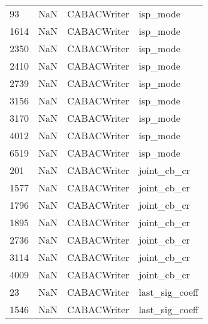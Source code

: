 \begin{tabular}{llll}
93   &                   NaN &                CABACWriter &                                  isp\_mode \\
1614 &                   NaN &                CABACWriter &                                  isp\_mode \\
2350 &                   NaN &                CABACWriter &                                  isp\_mode \\
2410 &                   NaN &                CABACWriter &                                  isp\_mode \\
2739 &                   NaN &                CABACWriter &                                  isp\_mode \\
3156 &                   NaN &                CABACWriter &                                  isp\_mode \\
3170 &                   NaN &                CABACWriter &                                  isp\_mode \\
4012 &                   NaN &                CABACWriter &                                  isp\_mode \\
6519 &                   NaN &                CABACWriter &                                  isp\_mode \\
201  &                   NaN &                CABACWriter &                               joint\_cb\_cr \\
1577 &                   NaN &                CABACWriter &                               joint\_cb\_cr \\
1796 &                   NaN &                CABACWriter &                               joint\_cb\_cr \\
1895 &                   NaN &                CABACWriter &                               joint\_cb\_cr \\
2736 &                   NaN &                CABACWriter &                               joint\_cb\_cr \\
3114 &                   NaN &                CABACWriter &                               joint\_cb\_cr \\
4009 &                   NaN &                CABACWriter &                               joint\_cb\_cr \\
23   &                   NaN &                CABACWriter &                            last\_sig\_coeff \\
1546 &                   NaN &                CABACWriter &                            last\_sig\_coeff \\

\end{tabular}
